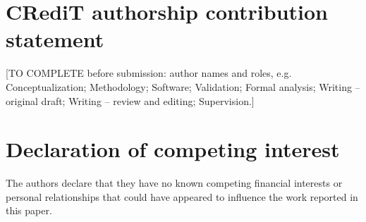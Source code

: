 \documentclass[preprint,12pt]{elsarticle}
\begin{document}
\begin{abstract}
Reinforcement learning (RL) is often introduced into a discrete-event simulation once an action can be varied, without first establishing that the action exposes observable and resource-adjusted state-contingent value. We develop a preregistered eligibility framework comprising physical liveness, action-ranking diversity, perfect-information headroom, observable conversion, resource equivalence, and out-of-sample robustness. The framework is evaluated in a thesis-grounded reconstruction of a 13-operation military food supply chain and in disclosed convoy, readiness, and spatial extensions. A PPO advantage of $+0.000486$ against a restricted static frontier reverses against a same-contract constant: PPO minus static ReT is $-0.000018049$, CI95 $[-0.000028615,-0.000008087]$. A finite-convoy oracle later exposes material clairvoyant headroom ($+0.02212$), but ten MaskablePPO seeds convert essentially none of it. In a terminal spatial audit on 400 locked tapes, blind alternation beats cover, MPC, and depth-3 trees on order ReT, quantity-weighted ReT, attended orders, worst-node fill, and unfulfilled rations. Metric triangulation further shows that a Cobb--Douglas-inspired aggregate can reverse policy rankings while worsening spatial continuity. The evidence demonstrates that physical authority and clairvoyant headroom are insufficient to warrant RL; comparator rights, deployable information, resource accounting, and the resilience functional jointly determine whether adaptive-control claims are identified.
\end{abstract}
\fi








\section*{CRediT authorship contribution statement}
[TO COMPLETE before submission: author names and roles, e.g.
Conceptualization; Methodology; Software; Validation; Formal analysis;
Writing -- original draft; Writing -- review and editing; Supervision.]

\section*{Declaration of competing interest}
The authors declare that they have no known competing financial
interests or personal relationships that could have appeared to
influence the work reported in this paper.
\end{document}
